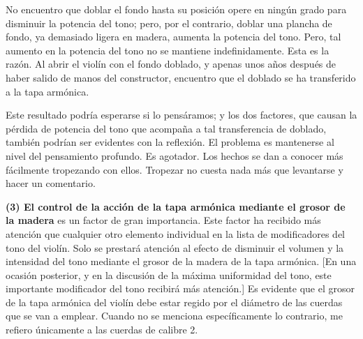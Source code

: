 \documentclass[12pt]{book}
\begin{document}
No encuentro que doblar el fondo hasta su posición opere en ningún grado para disminuir la potencia del tono; pero, por el contrario, doblar una plancha de fondo, ya demasiado ligera en madera, aumenta la potencia del tono. Pero, tal aumento en la potencia del tono no se mantiene indefinidamente. Esta es la razón. Al abrir el violín con el fondo doblado, y apenas unos años después de haber salido de manos del constructor, encuentro que el doblado se ha transferido a la tapa armónica.

Este resultado podría esperarse si lo pensáramos; y los dos factores, que causan la pérdida de potencia del tono que acompaña a tal transferencia de doblado, también podrían ser evidentes con la reflexión. El problema es mantenerse al nivel del pensamiento profundo. Es agotador. Los hechos se dan a conocer más fácilmente tropezando con ellos. Tropezar no cuesta nada más que levantarse y hacer un comentario.

\textbf{(3) El control de la acción de la tapa armónica mediante el grosor de la madera} es un factor de gran importancia. Este factor ha recibido más atención que cualquier otro elemento individual en la lista de modificadores del tono del violín. Solo se prestará atención al efecto de disminuir el volumen y la intensidad del tono mediante el grosor de la madera de la tapa armónica. [En una ocasión posterior, y en la discusión de la máxima uniformidad del tono, este importante modificador del tono recibirá más atención.] Es evidente que el grosor de la tapa armónica del violín debe estar regido por el diámetro de las cuerdas que se van a emplear. Cuando no se menciona específicamente lo contrario, me refiero únicamente a las cuerdas de calibre 2.
\end{document}
